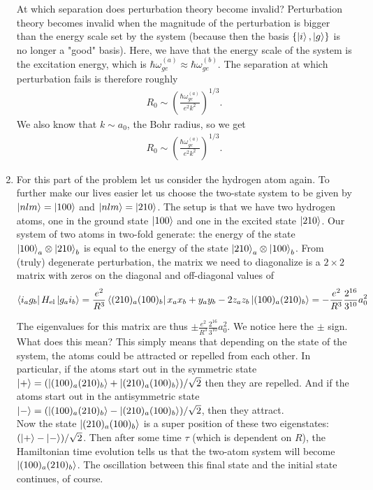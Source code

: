 \documentclass{article}
\theoremstyle{definition}
\newcommand{\f}[2]{\frac{#1}{#2}}
\newcommand{\lp}{\left(}
\newcommand{\rp}{\right)}
\begin{document}
\begin{enumerate}[label=(\alph*)]
At which separation does perturbation theory become invalid? Perturbation theory becomes invalid when the magnitude of the perturbation is bigger than the energy scale set by the system (because then the basis $\{\ket{i}, \ket{g} \}$ is no longer a "good" basis). Here, we have that the energy scale of the system is the excitation energy, which is $\hbar \omega_{ge}^{(a)} \approx \hbar \omega_{ge}^{(b)}$. The separation at which perturbation fails is therefore roughly
\begin{align*}
R_0 \sim \lp \f{\hbar \omega_{ge}^{(a)}}{ e^2 k^2} \rp^{1/3}. 
\end{align*}
We also know that $k\sim a_0$, the Bohr radius, so we get
\begin{align*}
R_0 \sim \lp \f{\hbar \omega_{ge}^{(a)}}{ e^2 k^2} \rp^{1/3}.
\end{align*}


\item For this part of the problem let us consider the hydrogen atom again. To further make our lives easier let us choose the two-state system to be given by $\ket{nlm} = \ket{100}$ and $\ket{nlm} = \ket{210}$. The setup is that we have two hydrogen atoms, one in the ground state $\ket{100}$ and one in the excited state $\ket{210}$. Our system of two atoms in two-fold generate: the energy of the state $\ket{100}_a \otimes \ket{210}_b$ is equal to the energy of the state $\ket{210}_a \otimes \ket{100}_b$. From (truly) degenerate perturbation, the matrix we need to diagonalize is a $2\times 2$ matrix with zeros on the diagonal and off-diagonal values of
\begin{align*}
\bra{i_a g_b} H_\text{el} \ket{g_a i_b} = \f{e^2}{R^3} \bra{(210)_a (100)_b} x_a x_b + y_a y_b - 2 z_a z_b \ket{(100)_a (210)_b} = -\f{e^2}{R^3} \f{2^{16}}{3^{10}} a_0^2 
\end{align*}

The eigenvalues for this matrix are thus $\pm \f{e^2}{R^3} \f{2^{16}}{3^{10}} a_0^2 $. We notice here the $\pm$ sign. What does this mean? This simply means that depending on the state of the system, the atoms could be attracted or repelled from each other. In particular, if the atoms start out in the symmetric state $\ket{+}  = (\ket{(100)_a (210)_b} + \ket{(210)_a (100)_b})/\sqrt{2}$ then they are repelled. And if the atoms start out in the antisymmetric state $\ket{-} = (\ket{(100)_a (210)_b} - \ket{(210)_a (100)_b})/\sqrt{2}$, then they attract. \\

Now the state $\ket{(210)_a (100)_b}$ is a super position of these two eigenstates: $(\ket{+} - \ket{-})/\sqrt{2}$. Then after some time $\tau$ (which is dependent on $R$), the Hamiltonian time evolution tells us that the two-atom system will become $\ket{(100)_a (210)_b}$. The oscillation between this final state and the initial state continues, of course. \\


\end{enumerate}
\end{document}
